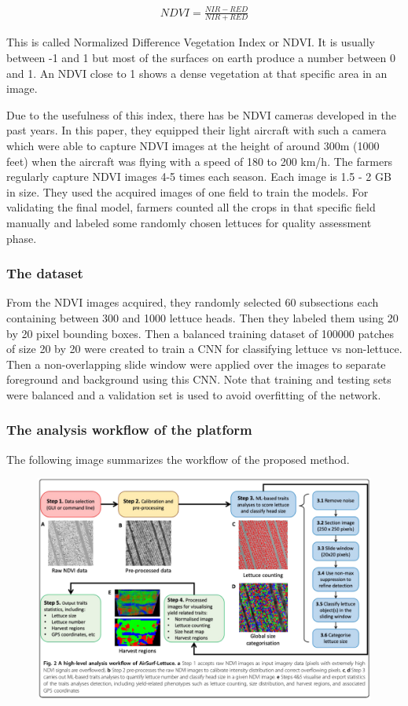 \documentclass{article}
\begin{document}
\begin{eqnarray*}
	NDVI = \frac{NIR - RED}{NIR + RED}
\end{eqnarray*}

This is called Normalized Difference Vegetation Index or NDVI. It is usually between -1 and 1 but most of the surfaces on earth produce a number between 0 and 1. An NDVI close to 1 shows a dense vegetation at that specific area in an image. 

Due to the usefulness of this index, there has be NDVI cameras developed in the past years. In this paper, they equipped their light aircraft with such a camera which were able to capture NDVI images at the height of around 300m (1000 feet) when the aircraft was flying with a speed of 180 to 200 km/h. The farmers regularly capture NDVI images 4-5 times each season. Each image is 1.5 - 2 GB in size. They used the acquired images of one field to train the models. For validating the final model, farmers counted all the crops in that specific field manually and labeled some randomly chosen lettuces for quality assessment phase. 

\subsubsection{The dataset}

From the NDVI images acquired, they randomly selected 60 subsections each containing between 300 and 1000 lettuce heads. Then they labeled them using 20 by 20 pixel bounding boxes. Then a balanced training dataset of 100000 patches of size 20 by 20 were created to train a CNN for classifying lettuce vs non-lettuce. Then a non-overlapping slide window were applied over the images to separate foreground and background using this CNN. Note that training and testing sets were balanced and a validation set is used to avoid overfitting of the network. 

\subsubsection{The analysis workflow of the platform}

The following image summarizes the workflow of the proposed method. 

\begin{figure}[H]
	\begin{center}
		\includegraphics[width=14cm]{img/1}
	\end{center}
\end{figure}
	


	
\end{document}
